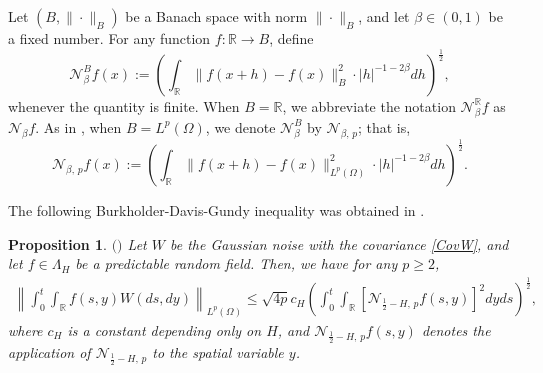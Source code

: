 \documentclass[11pt,reqno]{amsart}
\numberwithin{equation}{section}
\newtheorem{proposition}[theorem]{Proposition}
\newtheorem{definition}[theorem]{Definition}
\newcommand{\1}{{\bf 1}}
\newcommand{\2}{{\bf 2}}
\begin{document}
 

%

  
  
  
  
 Let $(B,\|\cdot\|_{B})$ be a Banach space with  norm $\|\cdot\|_{B}$, and  let $\beta\in(0,1)$ be a fixed number. For any function $f:\mathbb{R}\to B$, define  
\begin{equation}\label{NBNorm}
   \mathcal{N}_{\beta}^{B}f(x):=\left(\int_{\mathbb{R}}\|f(x+h)-f(x)\|_B^2\cdot |h|^{-1-2\beta}dh\right)^{\frac 12},
 \end{equation}
whenever the  quantity is finite.  When $B=\mathbb{R}$, we abbreviate the notation $\mathcal{N}_{\beta}^{\mathbb{R}}f$  as  $\mathcal{N}_{\beta}f$.  As in \cite{HHLNT2017,HW2022},  when $B=L^p(\Omega)$, we  denote $ \mathcal{N}_{\beta}^{B}$ by $\mathcal{N}_{\beta,\,p}$; that is,
 \begin{equation}\label{NpNorm}
   \mathcal{N}_{\beta,\,p}f(x):=\left(\int_{\mathbb{R}}\|f(x+h)-f(x)\|^2_{L^p(\Omega)} \cdot |h|^{-1-2\beta}dh\right)^{\frac 12}.
 \end{equation}

The following Burkholder-Davis-Gundy inequality was obtained in  \cite{HHLNT2017}.
  \begin{proposition}\label{prop BDG}   $($\cite[Proposition 3.2]{HHLNT2017}$)$
   Let $W$ be the Gaussian noise with the covariance \eqref{CovW}, and let    $f\in\Lambda_H$  be a predictable random field. Then, we have  for any $p\ge 2$,
   \begin{equation}\label{eq BDG}
     \begin{split}
        \left\|\int_{0}^{t}\int_{\mathbb{R}}f(s,y) W(ds,dy)\right\|_{L^p(\Omega)}
     \leq \sqrt{4p}c_{H}\left(\int_{0}^{t}\int_{\mathbb{R}}\left[\mathcal{N}_{\frac 12-H,\,p}f(s,y)\right]^2dyds\right)^{\frac 12},
     \end{split}
   \end{equation}
   where $c_{H}$ is a constant depending only on $H$,  and    $\mathcal{N}_{\frac 12-H,\,p}f(s,y)$ denotes the application of $\mathcal{N}_{\frac 12-H,\,p} $  to the spatial variable $y$.
 \end{proposition}
\end{document}

